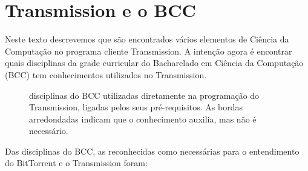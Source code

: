
\chapter{Transmission e o BCC}
\label{chap:bcc}

Neste texto descrevemos que são encontrados vários elementos de Ciência da Computação no
programa cliente Transmission. A intenção agora é encontrar quais disciplinas da grade
curricular do Bacharelado em Ciência da Computação (BCC) tem conhecimentos utilizados
no Transmission.

\begin{figure}[H]
    \centering
    \caption{disciplinas do BCC utilizadas diretamente na programação do Transmission, ligadas pelos seus pré-requisitos. As bordas arredondadas indicam que o conhecimento auxilia, mas não é necessário.}
    \label{fig:bcc}
\end{figure}

Das disciplinas do BCC, as reconhecidas como necessárias para o entendimento do
BitTorrent e o Transmission foram:

